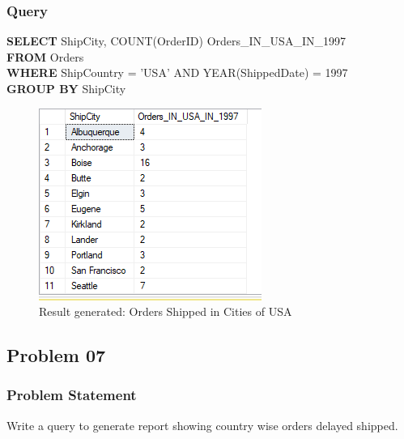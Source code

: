 \documentclass[12pt,a4paper]{report}
\begin{document}
\subsubsection{Query}
\begin{center}
	\begin{minipage}{12cm}
		\textbf{SELECT} ShipCity, COUNT(OrderID) Orders\_IN\_USA\_IN\_1997\\
		\textbf{FROM} Orders\\
		\textbf{WHERE} ShipCountry = 'USA' AND YEAR(ShippedDate) = 1997\\
		\textbf{GROUP BY} ShipCity
	\end{minipage}
	\begin{figure}[h]
	\centering
		\includegraphics[scale=0.7]{images/11.png}
		\caption{Result generated: Orders Shipped in Cities of USA}
	\end{figure}
\end{center}

\subsection{Problem 07}
\subsubsection{Problem Statement}
Write a query to generate report showing country wise orders delayed shipped. 
\end{document}
